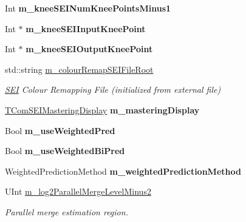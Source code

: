 \begin{DoxyCompactItemize}
Int {\bfseries m\+\_\+knee\+S\+E\+I\+Num\+Knee\+Points\+Minus1}
\item 
\mbox{\label{class_t_enc_cfg_a731a17a99dfa564686009b3574c90664}} 
Int $\ast$ {\bfseries m\+\_\+knee\+S\+E\+I\+Input\+Knee\+Point}
\item 
\mbox{\label{class_t_enc_cfg_a5f92759ae8c45775efbf35efd5a9586e}} 
Int $\ast$ {\bfseries m\+\_\+knee\+S\+E\+I\+Output\+Knee\+Point}
\item 
\mbox{\label{class_t_enc_cfg_a11d2bc669e47ddb1d79295798eeb5f0a}} 
std\+::string \hyperlink{class_t_enc_cfg_a11d2bc669e47ddb1d79295798eeb5f0a}{m\+\_\+colour\+Remap\+S\+E\+I\+File\+Root}
\begin{DoxyCompactList}\small\item\em \hyperlink{class_s_e_i}{S\+EI} Colour Remapping File (initialized from external file) \end{DoxyCompactList}\item 
\mbox{\label{class_t_enc_cfg_ac23af75605aa7882d5fdde9750599054}} 
\hyperlink{struct_t_com_s_e_i_mastering_display}{T\+Com\+S\+E\+I\+Mastering\+Display} {\bfseries m\+\_\+mastering\+Display}
\item 
\mbox{\label{class_t_enc_cfg_aa90ffe09bcc485c9e2abfe71fad4ecf5}} 
Bool {\bfseries m\+\_\+use\+Weighted\+Pred}
\item 
\mbox{\label{class_t_enc_cfg_a7c94c28f5e8875ca85eca855cfba71ff}} 
Bool {\bfseries m\+\_\+use\+Weighted\+Bi\+Pred}
\item 
\mbox{\label{class_t_enc_cfg_ada183939d44d42db825663da8a4cf208}} 
Weighted\+Prediction\+Method {\bfseries m\+\_\+weighted\+Prediction\+Method}
\item 
\mbox{\label{class_t_enc_cfg_aaad63b91481828039fabb997419a833c}} 
U\+Int \hyperlink{class_t_enc_cfg_aaad63b91481828039fabb997419a833c}{m\+\_\+log2\+Parallel\+Merge\+Level\+Minus2}
\begin{DoxyCompactList}\small\item\em Parallel merge estimation region. \end{DoxyCompactList}\item 

\end{DoxyCompactItemize}
